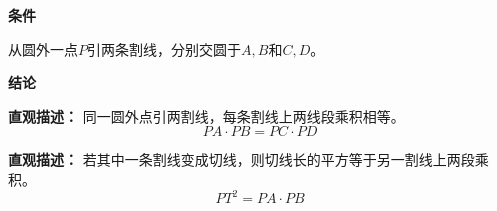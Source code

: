 \begin{statementbox}
	\textbf{\textcolor{CStatement}{条件}}
	\begin{description}[style=nextline, leftmargin=2.8em, labelsep=0.5em, itemsep=0.35em]
		\item[\textbf{\textcolor{CStatement}{条件1（圆外一点）：}}]从圆外一点$P$引两条割线，分别交圆于$A,B$和$C,D$。
	\end{description}

	\textbf{\textcolor{CStatement}{结论}}
	\begin{description}[style=nextline, leftmargin=2.8em, labelsep=0.5em, itemsep=0.45em]
		\item[\textbf{\textcolor{CStatement}{结论一（割线定理）：}}]
			\textbf{\textcolor{CStatement}{直观描述：}}
			同一圆外点引两割线，每条割线上两线段乘积相等。
			\[
				\boxed{PA\cdot PB = PC\cdot PD}
			\]

		\item[\textbf{\textcolor{CStatement}{推广结论（切线情形）：}}]
			\textbf{\textcolor{CStatement}{直观描述：}}
			若其中一条割线变成切线，则切线长的平方等于另一割线上两段乘积。
			\[
				\boxed{PT^2 = PA\cdot PB}
			\]
	\end{description}
\end{statementbox}
